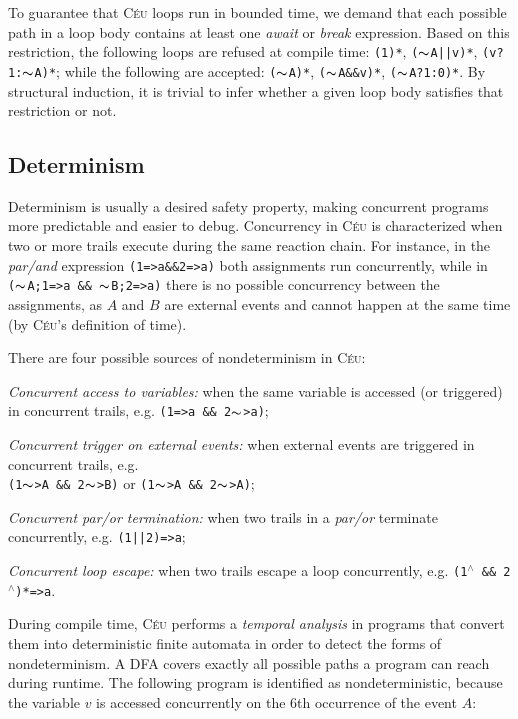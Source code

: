 \documentclass{sig-alternate-ipsn09}
\newcommand{\2}{\;\;}
\newcommand{\5}{\;\;\;\;\;}
\newcommand{\til}{$\thicksim$}
\newcommand{\brk}{\textbf{\small{$^\wedge$}}}
\newcommand{\CEU}{\textsc{C\'{e}u}}
\newcommand{\code}[1] {{\small{\texttt{#1}}}}
\begin{document}
To guarantee that \CEU{} loops run in bounded time, we demand that each 
possible path in a loop body contains at least one \emph{await} or \emph{break} 
expression.
Based on this restriction, the following loops are refused at compile time:
\code{(1)*}, \code{(\til{}A||v)*}, \code{(v?1:\til{}A)*}; while the following 
are accepted: \code{(\til{}A)*}, \code{(\til{}A\&\&v)*}, \code{(\til{}A?1:0)*}.
By structural induction, it is trivial to infer whether a given loop body 
satisfies that restriction or not.

\subsection{Determinism}
\label{sec:ceu:det}

Determinism is usually a desired safety property, making concurrent programs 
more predictable and easier to debug.
Concurrency in \CEU{} is characterized when two or more trails execute during 
the same reaction chain.
For instance, in the \emph{par/and} expression \texttt{(1=>a\&\&2=>a)} both 
assignments run concurrently, while in \\
\texttt{(\til{}A;1=>a~\&\&~\til{}B;2=>a)} there is no possible concurrency 
between the assignments, as $A$ and $B$ are external events and cannot happen 
at the same time (by \CEU's definition of time).

There are four possible sources of nondeterminism in \CEU:

\emph{Concurrent access to variables:} when the same variable is accessed (or 
triggered) in concurrent trails, e.g. \code{(1=>a~\&\&~2\til>a)};

\emph{Concurrent trigger on external events:} when external events are 
triggered in concurrent trails, e.g.\\
\code{(1\til>A~\&\&~2\til>B)} or \code{(1\til>A~\&\&~2\til>A)};

\emph{Concurrent \emph{par/or} termination:} when two trails in a \emph{par/or} 
terminate concurrently, e.g. \code{(1||2)=>a};

\emph{Concurrent loop escape:} when two trails escape a loop concurrently, e.g.  
\code{(1\brk{}~\&\&~2\brk)*=>a}.

During compile time, \CEU{} performs a \emph{temporal analysis} in programs 
that convert them into deterministic finite automata in order to detect the 
forms of nondeterminism.
A DFA covers exactly all possible paths a program can reach during runtime.
The following program is identified as nondeterministic, because the variable 
$v$ is accessed concurrently on the 6th occurrence of the event $A$:
\end{document}
